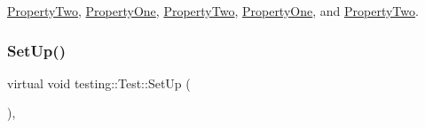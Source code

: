 \mbox{\hyperlink{class_property_two_a88216ddb0ed17e58c9f974a743208fca}{Property\+Two}}, \mbox{\hyperlink{class_property_one_a0a31b0c199b14438b9cfbd27645aa542}{Property\+One}}, \mbox{\hyperlink{class_property_two_a88216ddb0ed17e58c9f974a743208fca}{Property\+Two}}, \mbox{\hyperlink{class_property_one_a9cb7d7cb508d5f1a6fc7cfead81ebc2b}{Property\+One}}, and \mbox{\hyperlink{class_property_two_aa3ab39cf4e6c751cb0788c575bf92ca2}{Property\+Two}}.

\mbox{\label{classtesting_1_1_test_a8b38992669fb844864807cf32e416853}} 
\subsubsection{\texorpdfstring{SetUp()}{SetUp()}\hspace{0.1cm}{\footnotesize\ttfamily [2/3]}}
{\footnotesize\ttfamily virtual void testing\+::\+Test\+::\+Set\+Up (\begin{DoxyParamCaption}{ }\end{DoxyParamCaption})\hspace{0.3cm}{\ttfamily [protected]}, {\ttfamily [virtual]}}



